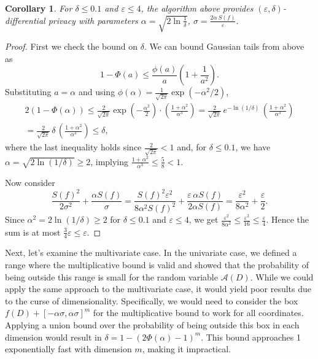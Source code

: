 \documentclass[12pt,letterpaper]{article}
\let\eps\varepsilon
\newtheorem{corollary}{Corollary}
\begin{document}
\begin{corollary}
  \label{cor:coef}
  For $\delta \leq 0.1$ and $\eps \leq 4$, the algorithm above provides $(\eps, \delta)$-differential privacy with parameters $\alpha = \sqrt{2 \ln\tfrac{1}{\delta}}$, $\sigma = \tfrac{2\alpha \, S(f)}{\eps}$.
\end{corollary}
\begin{proof}
First we check the bound on $\delta$. We can bound Gaussian tails from above as
$$1 - \Phi(a) \leq \frac{\phi(a)}{a}\left(1 + \frac{1}{a^2}\right).$$
Substituting $a=\alpha$ and using $\phi(\alpha)=\frac{1}{\sqrt{2\pi}}\exp(-\alpha^2/2)$,
\begin{multline*}
2(1 - \Phi(\alpha)) \leq \frac{2}{\sqrt{2\pi}} \exp\left(-\frac{\alpha^2}{2}\right) \cdot \left(\frac{1 + \alpha^2}{\alpha^3}\right) 
= \frac{2}{\sqrt{2\pi}} \, e^{-\ln(1/\delta)} \, \left(\frac{1 + \alpha^2}{\alpha^3}\right) \\
= \frac{2}{\sqrt{2\pi}}\, \delta \, \left(\frac{1 + \alpha^2}{\alpha^3}\right) \leq \delta,
\end{multline*}
where the last inequality holds since $\tfrac{2}{\sqrt{2\pi}}<1$ and, for $\delta\le 0.1$, we have $\alpha=\sqrt{2\ln(1/\delta)}\ge 2$, implying $\tfrac{1+\alpha^2}{\alpha^3} \le \tfrac{5}{8} < 1$.

Now consider
$$\frac{S(f)^2}{2\sigma^2} + \frac{\alpha S(f)}{\sigma} = \frac{S(f)^2\eps^2}{8\alpha^2S(f)^2} + \frac{\eps \, \alpha S(f)}{2\alpha S(f)} = \frac{\eps^2}{8\alpha^2} + \frac{\eps}{2}.$$
Since $\alpha^2 = 2\ln(1/\delta) \ge 2$ for $\delta\leq 0.1$ and $\eps\leq 4$, we get $\tfrac{\eps^2}{8\alpha^2} \le \tfrac{\eps^2}{16} \le \tfrac{\eps}{4}$. Hence the sum is at most $\tfrac{3}{4}\eps \le \eps$.
\end{proof}

Next, let's examine the multivariate case. In the univariate case, we defined a range where the multiplicative bound is valid and showed that the probability of being outside this range is small for the random variable $\mathcal{A}(D)$. While we could apply the same approach to the multivariate case, it would yield poor results due to the curse of dimensionality. Specifically, we would need to consider the box $f(D) + [-\alpha\sigma, \alpha\sigma]^m$ for the multiplicative bound to work for all coordinates. Applying a union bound over the probability of being outside this box in each dimension would result in $\delta = 1 - (2\Phi(\alpha) - 1)^m$. This bound approaches 1 exponentially fast with dimension $m$, making it impractical.\\
\end{document}
